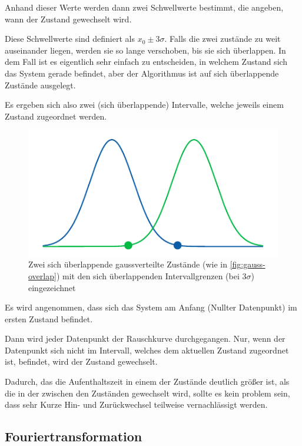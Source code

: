 \documentclass[main.tex]{subfiles}
\begin{document}
Anhand dieser Werte werden dann zwei Schwellwerte bestimmt, die angeben, wann der Zustand gewechselt wird.

Diese Schwellwerte sind definiert als \(x_0 \pm 3\sigma\). Falls die zwei zustände zu weit auseinander liegen, werden sie so lange verschoben, bis sie sich überlappen. 
In dem Fall ist es eigentlich sehr einfach zu entscheiden, in welchem Zustand sich das System gerade befindet, aber der Algorithmus ist auf sich überlappende Zustände ausgelegt.

Es ergeben sich also zwei (sich überlappende) Intervalle, welche jeweils einem Zustand zugeordnet werden.

\begin{figure}[h]
    \centering
    \includegraphics{bilder/plots/theo-vis/bounds.pdf}
    \caption{Zwei sich überlappende gaussverteilte Zustände (wie in \cref{fig:gauss-overlap}) mit den sich überlappenden Intervallgrenzen (bei \(3\sigma\)) eingezeichnet }
\end{figure}


Es wird angenommen, dass sich das System am Anfang (Nullter Datenpunkt) im ersten Zustand befindet.

Dann wird jeder Datenpunkt der Rauschkurve durchgegangen. Nur, wenn der Datenpunkt sich nicht im Intervall, welches dem aktuellen Zustand zugeordnet ist, befindet, wird der Zustand gewechselt. 


Dadurch, das die Aufenthaltszeit in einem der Zustände deutlich größer ist, als die in der zwischen den Zuständen gewechselt wird, sollte es kein problem sein, dass sehr Kurze Hin- und Zurückwechsel teilweise vernachlässigt werden. 



\subsection{Fouriertransformation}
\end{document}
